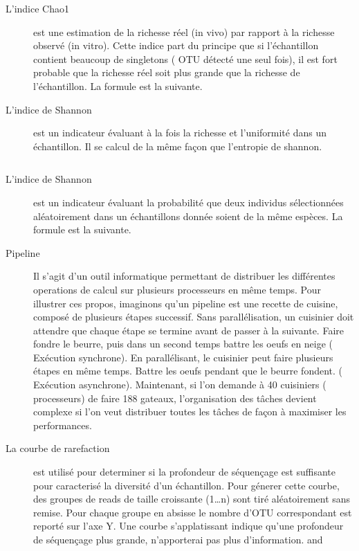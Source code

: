 \documentclass[12pt,a4paper]{article}
\begin{document}
\begin{description}
\item[L'indice Chao1] est une estimation de la richesse réel (in vivo) par rapport à la richesse observé (in vitro). Cette indice part du principe que si l’échantillon contient beaucoup de singletons ( OTU détecté une seul fois), il est fort probable que la richesse réel soit plus grande que la richesse de l’échantillon. La formule est la suivante.
\begin{equation}
\end{equation}

\item[L'indice de Shannon] est un indicateur évaluant à la fois la richesse et l’uniformité dans un échantillon. Il se calcul de la même façon que l’entropie de shannon.

\begin{equation}
\end{equation}

\item[L'indice de Shannon] est un indicateur évaluant la probabilité que deux individus sélectionnées aléatoirement dans un échantillons donnée soient de la même espèces. La formule est la suivante.

\item[Pipeline] 
Il s'agit d'un outil informatique permettant de distribuer les différentes operations de calcul sur plusieurs processeurs en même temps. Pour illustrer ces propos, imaginons qu’un pipeline est une recette de cuisine, composé de plusieurs étapes successif. Sans parallélisation, un cuisinier doit attendre que chaque étape se termine avant de passer à la suivante. Faire fondre le beurre, puis dans un second temps battre les oeufs en neige ( Exécution synchrone). En parallélisant, le cuisinier peut faire plusieurs étapes en même temps. Battre les oeufs pendant que le beurre fondent. ( Exécution asynchrone). Maintenant, si l’on demande à 40 cuisiniers ( processeurs) de faire 188 gateaux, l’organisation des tâches devient complexe si l’on veut distribuer toutes les tâches de façon à maximiser les performances.

\item[La courbe de rarefaction] est utilisé pour determiner si la profondeur de séquençage est suffisante pour caracterisé la diversité d’un échantillon.
Pour génerer cette courbe, des groupes de reads de taille croissante (1…n) sont tiré aléatoirement sans remise. Pour chaque groupe en absisse le nombre d’OTU correspondant est reporté sur l’axe Y.
Une courbe s’applatissant indique qu’une profondeur de séquençage plus grande, n’apporterai pas plus d’information. \citep{Dickson2014} and \citep{Beck}

\end{description}
\end{document}
